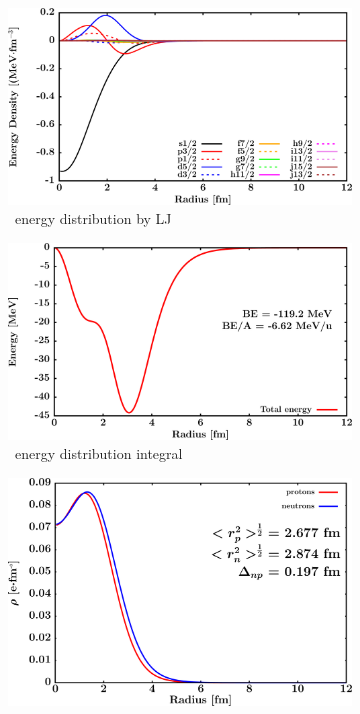\begin{figure}[hbtp]
    \begin{subfigure}{0.45\textwidth}
        \centering
        \includegraphics[width=\linewidth]{figures/o18_EnergyDist.png}
        \caption{\oEight\ energy distribution by LJ}
        \label{DOMFitData_o18_proton_energyDistInt}
    \end{subfigure}\hspace{6pt}
    \begin{subfigure}{0.45\textwidth}
        \centering
        \includegraphics[width=\linewidth]{figures/o18_EnergyDistIntegral.png}
        \caption{\oEight\ energy distribution integral}
        \label{DOMFitData_o18_neutron_energyDistInt}
    \end{subfigure}\vspace{0.4in}
    \begin{subfigure}{0.70\textwidth}
        \centering
        \includegraphics[width=\linewidth]{figures/o18_matterDensity.png}

\end{subfigure}
\end{figure}
